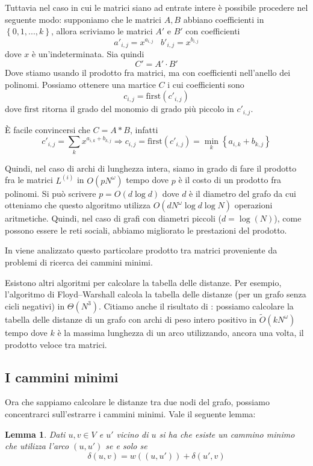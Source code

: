 \documentclass[a4paper,10pt]{amsbook}
\newcounter{counter1}
\theoremstyle{plain}
\newtheorem{mylem}[counter1]{Lemma}
\theoremstyle{definition}
\theoremstyle{remark}
\newcommand{\set}[1]{\left\{#1\right\}}
\newcommand{\pa}[1]{\left(#1\right)}
\begin{document}
Tuttavia nel caso in cui le matrici siano ad entrate intere \`e
possibile procedere nel seguente modo: supponiamo che le matrici $A,B$
abbiano coefficienti in $\set{0, 1,...,k}$, allora scriviamo le
matrici $A'$ e $B'$ con coefficienti
\[ a'_{i,j} = x ^{a_{i,j}} \;\;\; b'_{i,j} = x ^{b_{i,j}} \]
dove $x$ è un'indeterminata. Sia quindi
\[ C' = A' \cdot B' \]
Dove stiamo usando il prodotto fra matrici, ma con coefficienti
nell'anello dei polinomi. Possiamo ottenere una martice $C$ i cui
coefficienti sono
\[ c _{i,j} = \mathrm{first}\pa{c'_{i,j}} \]
dove $\mathrm{first}$ ritorna il grado del monomio di grado più
piccolo in $c'_{i,j}$.

È facile convincersi che $C = A * B$, infatti 
\[ c'_{i,j} = \sum _k x^{a_{i,k} + b_{k,j}} \Rightarrow c_{i,j} =
\mathrm{first} \pa{c'_{i,j}} = \min _k \set{ a_{i,k} + b_{k,j} } \]

Quindi, nel caso di archi di lunghezza intera, siamo in grado di fare
il prodotto fra le matrici $L^{(i)}$ in $O\pa{pN^\omega }$ tempo dove $p$ è
il costo di un prodotto fra polinomi. Si pu\`o scrivere $p = O\pa{d
  \log d}$ dove $d$ \`e il diametro del grafo da cui otteniamo che
questo algoritmo utilizza $O\pa{ d N ^\omega \log d \log N}$
operazioni aritmetiche. Quindi, nel caso di grafi con diametri
piccoli ($d = \log\pa{N}$), come possono essere le reti sociali, abbiamo
migliorato le prestazioni del prodotto.

In \cite{funnymult} viene analizzato questo particolare prodotto tra
matrici proveniente da problemi di ricerca dei cammini minimi.


Esistono altri algoritmi per calcolare la tabella delle distanze. Per
esempio, l'algoritmo di Floyd–Warshall calcola la tabella delle
distanze (per un grafo senza cicli negativi) in $\Theta\pa{ N^3}$.
Citiamo anche il risultato di \cite{apspfmp}: possiamo calcolare la
tabella delle distanze di un grafo con archi di peso intero positivo
in $\tilde O\pa{ kN^\omega}$ tempo dove $k$ è la massima lunghezza di
un arco utilizzando, ancora una volta, il prodotto veloce tra matrici.

\subsection{I cammini minimi}

Ora che sappiamo calcolare le distanze tra due nodi del grafo,
possiamo concentrarci sull'estrarre i cammini minimi. Vale il seguente
lemma:
\begin{mylem}
  \label{lem:vicinibuoni}
  Dati $u,v \in V$ e $u'$ vicino di $u$ si ha che esiste un cammino
  minimo che utilizza l'arco $(u,u')$ se e solo se
  \[ \delta \pa{ u,v} = w\pa{ (u,u') } + \delta \pa{ u',v} \]
\end{mylem}
\end{document}
